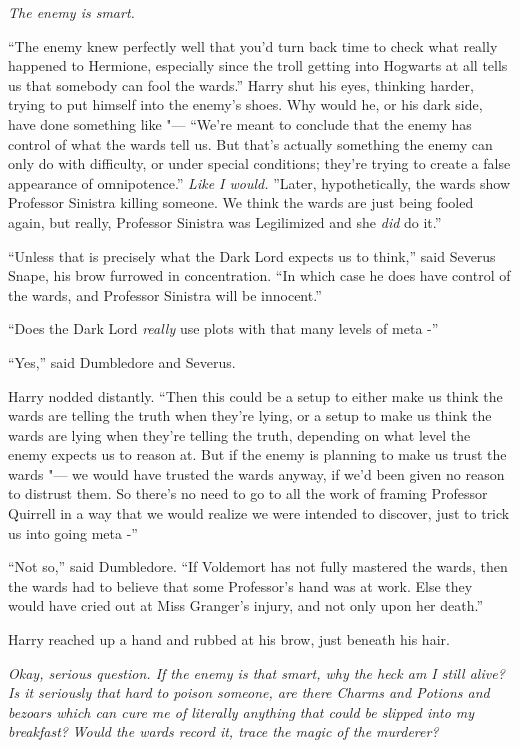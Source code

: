 \emph{The enemy is smart.}

``The enemy knew perfectly well that you'd turn back time to check what
really happened to Hermione, especially since the troll getting into
Hogwarts at all tells us that somebody can fool the wards.'' Harry shut
his eyes, thinking harder, trying to put himself into the enemy's shoes.
Why would he, or his dark side, have done something like "--- ``We're meant
to conclude that the enemy has control of what the wards tell us. But
that's actually something the enemy can only do with difficulty, or
under special conditions; they're trying to create a false appearance of
omnipotence.'' \emph{Like I would.} ''Later, hypothetically, the wards
show Professor Sinistra killing someone. We think the wards are just
being fooled again, but really, Professor Sinistra was Legilimized and
she \emph{did} do it.''

``Unless that is precisely what the Dark Lord expects us to think,''
said Severus Snape, his brow furrowed in concentration. ``In which case
he does have control of the wards, and Professor Sinistra will be
innocent.''

``Does the Dark Lord \emph{really} use plots with that many levels of
meta -''

``Yes,'' said Dumbledore and Severus.

Harry nodded distantly. ``Then this could be a setup to either make us
think the wards are telling the truth when they're lying, or a setup to
make us think the wards are lying when they're telling the truth,
depending on what level the enemy expects us to reason at. But if the
enemy is planning to make us trust the wards "--- we would have trusted the
wards anyway, if we'd been given no reason to distrust them. So there's
no need to go to all the work of framing Professor Quirrell in a way
that we would realize we were intended to discover, just to trick us
into going meta -''

``Not so,'' said Dumbledore. ``If Voldemort has not fully mastered the
wards, then the wards had to believe that some Professor's hand was at
work. Else they would have cried out at Miss Granger's injury, and not
only upon her death.''

Harry reached up a hand and rubbed at his brow, just beneath his hair.

\emph{Okay, serious question. If the enemy is that smart, why the heck
am I still alive? Is it seriously that hard to poison someone, are there
Charms and Potions and bezoars which can cure me of literally anything
that could be slipped into my breakfast?} \emph{Would the wards record
it, trace the magic of the murderer?}

